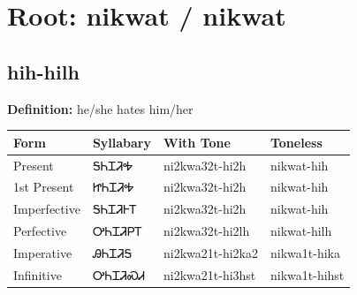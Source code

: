 \documentclass{article}%
\begin{document}
%
\normalsize%
\section*{Root: nikwat / nikwat}%
\subsection*{hih-hilh}%
\textbf{Definition: }%
he/she hates him/her%
\\[0.5em]%
\begin{tabular}{|l|l|l|l|}%
\hline%
\textbf{Form}&\textbf{Syllabary}&\textbf{With Tone}&\textbf{Toneless}\\%
\hline%
Present&ᎦᏂᏆᏘᎭ&ni2kwa32t{-}hi2h&nikwat{-}hih\\%
1st Present&ᏥᏂᏆᏘᎭ&ni2kwa32t{-}hi2h&nikwat{-}hih\\%
Imperfective&ᎦᏂᏆᏘᎰᎢ&ni2kwa32t{-}hi2h&nikwat{-}hih\\%
Perfective&ᎤᏂᏆᏘᏢᎢ&ni2kwa32t{-}hi2lh&nikwat{-}hilh\\%
Imperative&ᎯᏂᏆᏘᎦ&ni2kwa21t{-}hi2ka2&nikwa1t{-}hika\\%
Infinitive&ᎤᏂᏆᏘᏍᏗ&ni2kwa21t{-}hi3hst&nikwa1t{-}hihst\\%
\hline%
\end{tabular}%
\\[1em]%
\end{document}
